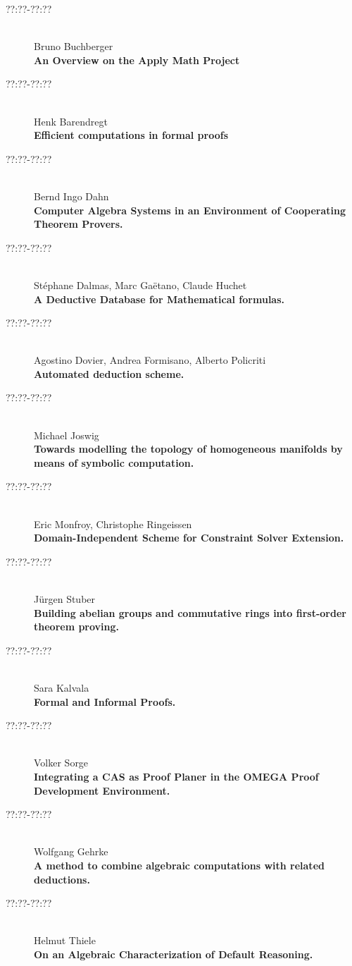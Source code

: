 \begin{description}
\item[??:??-??:??] \ \\
  Bruno Buchberger \\
  {\bf An Overview on the Apply Math Project} 
\item[??:??-??:??] \ \\
  Henk Barendregt \\
  {\bf Efficient computations in formal proofs} 
\item[??:??-??:??] \ \\ 
  Bernd Ingo Dahn \\
  {\bf Computer Algebra Systems in an Environment of Cooperating Theorem Provers.} 
\item[??:??-??:??] \ \\ 
  St\'ephane Dalmas, Marc Ga\"etano, Claude Huchet \\
  {\bf A Deductive Database for Mathematical formulas.} 
\item[??:??-??:??] \ \\ 
  Agostino Dovier, Andrea Formisano, Alberto Policriti\\
  {\bf Automated deduction scheme.}
\item[??:??-??:??] \ \\ 
  Michael Joswig\\
  {\bf Towards modelling the topology of homogeneous manifolds by
    means of symbolic computation.} 
\item[??:??-??:??] \ \\ 
  Eric Monfroy, Christophe Ringeissen\\
  {\bf Domain-Independent Scheme for Constraint Solver
  Extension.}
\item[??:??-??:??] \ \\ 
  J\"urgen Stuber\\
  {\bf Building abelian groups and commutative rings into first-order
    theorem proving.} 
\item[??:??-??:??] \ \\ 
  Sara Kalvala\\
  {\bf Formal and Informal Proofs.} 
\item[??:??-??:??] \ \\ 
  Volker Sorge\\
  {\bf Integrating a CAS as Proof Planer in the OMEGA Proof
    Development Environment.}  
\item[??:??-??:??] \ \\ 
  Wolfgang Gehrke\\
  {\bf A method to combine algebraic computations with related deductions.} 
\item[??:??-??:??] \ \\ 
  Helmut Thiele\\
  {\bf On an Algebraic Characterization of Default Reasoning.}
\end{description}

